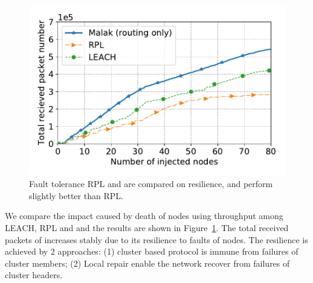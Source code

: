 \begin{figure}[htbp]
	\centering
	\includegraphics[width=.95\columnwidth]{Figure/fault_tolerance}
	\vspace{-0.1in}
	\caption{Fault tolerance
		\textnormal{
			RPL and {\sdn} are compared on resilience, and {\sdn} perform
			slightly better than RPL.
		}}
	\label{fig:fault_tolerance}
\end{figure}

We compare the impact caused by death of nodes using throughput among LEACH, RPL
and {\sdn} and the results are shown in Figure~\ref{fig:fault_tolerance}. The
total received packets of {\sdn} increases stably due to its resilience to faults
of nodes. The resilience is achieved by 2 approaches: (1) cluster based protocol
is immune from failures of cluster members; (2) Local repair enable the network
recover from failures of cluster headers.


